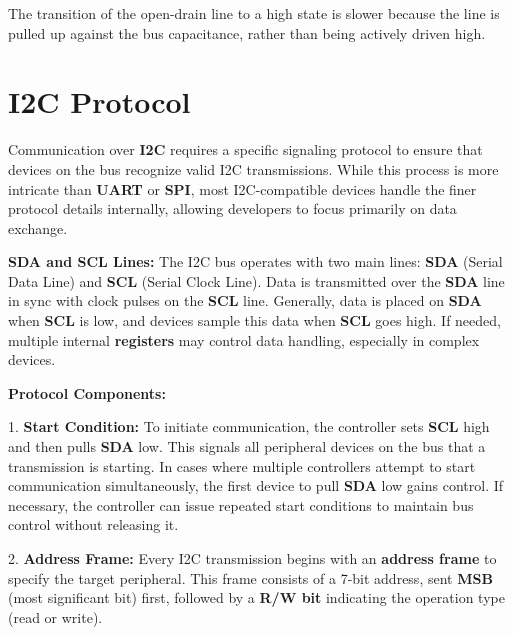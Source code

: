 \documentclass[a4paper,12pt]{report}
\begin{document}
The transition of the open-drain line to a high state is slower because the line is pulled up against the bus capacitance, rather than being actively driven high.

\section{I2C Protocol}

Communication over \textbf{I2C} requires a specific signaling protocol to ensure that devices on the bus recognize valid I2C transmissions. While this process is more intricate than \textbf{UART} or \textbf{SPI}, most I2C-compatible devices handle the finer protocol details internally, allowing developers to focus primarily on data exchange.

\vspace{0.25in}

\textbf{SDA and SCL Lines:}  
The I2C bus operates with two main lines: \textbf{SDA} (Serial Data Line) and \textbf{SCL} (Serial Clock Line). Data is transmitted over the \textbf{SDA} line in sync with clock pulses on the \textbf{SCL} line. Generally, data is placed on \textbf{SDA} when \textbf{SCL} is low, and devices sample this data when \textbf{SCL} goes high. If needed, multiple internal \textbf{registers} may control data handling, especially in complex devices.

\vspace{0.25in}

\textbf{Protocol Components:}

\vspace{0.25in}

1. \textbf{Start Condition:}  
   To initiate communication, the controller sets \textbf{SCL} high and then pulls \textbf{SDA} low. This signals all peripheral devices on the bus that a transmission is starting. In cases where multiple controllers attempt to start communication simultaneously, the first device to pull \textbf{SDA} low gains control. If necessary, the controller can issue repeated start conditions to maintain bus control without releasing it.

   \vspace{0.25in}


2. \textbf{Address Frame:}  
   Every I2C transmission begins with an \textbf{address frame} to specify the target peripheral. This frame consists of a 7-bit address, sent \textbf{MSB} (most significant bit) first, followed by a \textbf{R/W bit} indicating the operation type (read or write).  
\end{document}
